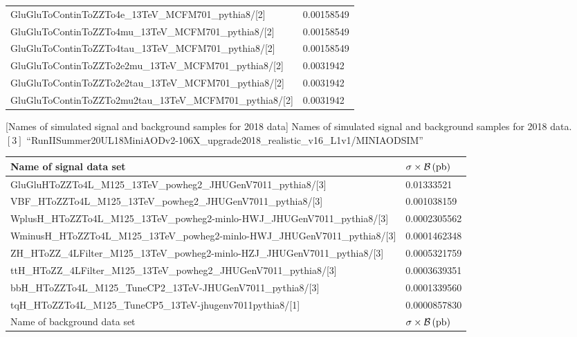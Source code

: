 \begin{table}[h]
\begin{tabular}{|ll|}
		GluGluToContinToZZTo4e\_13TeV\_MCFM701\_pythia8/[2]	&	0.00158549	\\
		GluGluToContinToZZTo4mu\_13TeV\_MCFM701\_pythia8/[2]	&	0.00158549	\\
		GluGluToContinToZZTo4tau\_13TeV\_MCFM701\_pythia8/[2]	&	0.00158549	\\
		GluGluToContinToZZTo2e2mu\_13TeV\_MCFM701\_pythia8/[2]	&	0.0031942	\\
		GluGluToContinToZZTo2e2tau\_13TeV\_MCFM701\_pythia8/[2]	&	0.0031942	\\
		GluGluToContinToZZTo2mu2tau\_13TeV\_MCFM701\_pythia8/[2]	&	0.0031942	\\
        \hline
        \end{tabular}
    \label{table:dilep_2017_simSamples}
\end{table}
\begin{table}[h]
    \small
        [Names of simulated signal and background samples for 2018 data] %
        {Names of simulated signal and background samples for 2018 data. \\ %
        $[3]$ ``RunIISummer20UL18MiniAODv2-106X\_upgrade2018\_realistic\_v16\_L1v1/MINIAODSIM''}
	\begin{tabular}{|ll|}
		\hline      
        Name of signal data set & $\sigma \times \mathcal{B}\,(\text{pb})$ \\
        \hline
		GluGluHToZZTo4L\_M125\_13TeV\_powheg2\_JHUGenV7011\_pythia8/[3]	&	0.01333521	\\
		VBF\_HToZZTo4L\_M125\_13TeV\_powheg2\_JHUGenV7011\_pythia8/[3]	&	0.001038159	\\
		WplusH\_HToZZTo4L\_M125\_13TeV\_powheg2-minlo-HWJ\_JHUGenV7011\_pythia8/[3]	&	0.0002305562	\\
		WminusH\_HToZZTo4L\_M125\_13TeV\_powheg2-minlo-HWJ\_JHUGenV7011\_pythia8/[3]	&	0.0001462348	\\
		ZH\_HToZZ\_4LFilter\_M125\_13TeV\_powheg2-minlo-HZJ\_JHUGenV7011\_pythia8/[3]	&	0.0005321759	\\
		ttH\_HToZZ\_4LFilter\_M125\_13TeV\_powheg2\_JHUGenV7011\_pythia8/[3]	&	0.0003639351	\\
		bbH\_HToZZTo4L\_M125\_TuneCP2\_13TeV-JHUGenV7011\_pythia8/[3]	&	0.0001339560	\\
		tqH\_HToZZTo4L\_M125\_TuneCP5\_13TeV-jhugenv7011\-pythia8/[1]	&	0.0000857830	\\
		\hline	
		\hline	
        Name of background data set & $\sigma \times \mathcal{B}\,(\text{pb})$ \\

\end{tabular}
\end{table}
